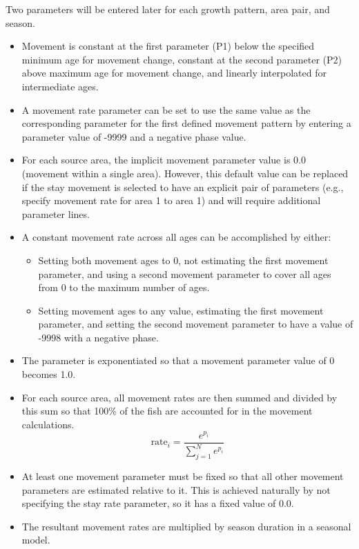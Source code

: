 Two parameters will be entered later for each growth pattern, area pair, and season.
\begin{itemize}
	\item Movement is constant at the first parameter (P1) below the specified minimum age for movement change, constant at the second parameter (P2) above maximum age for movement change, and linearly interpolated for intermediate ages.
	\item A movement rate parameter can be set to use the same value as the corresponding parameter for the first defined movement pattern by entering a parameter value of -9999 and a negative phase value.
	\item For each source area, the implicit movement parameter value is 0.0 (movement within a single area). However, this default value can be replaced if the stay movement is selected to have an explicit pair of parameters (e.g., specify movement rate for area 1 to area 1) and will require additional parameter lines.
	\item A constant movement rate across all ages can be accomplished by either:
	\begin{itemize}
		\item Setting both movement ages to 0, not estimating the first movement parameter, and using a second movement parameter to cover all ages from 0 to the maximum number of ages.
		\item Setting movement ages to any value, estimating the first movement parameter, and setting the second movement parameter to have a value of -9998 with a negative phase.
	\end{itemize} 
	\item The parameter is exponentiated so that a movement parameter value of 0 becomes 1.0.
	\item For each source area, all movement rates are then summed and divided by this sum so that 100\% of the fish are accounted for in the movement calculations.
	\begin{equation}
	\text{rate}_i = \frac{e^{p_i}}{\sum_{j=1}^{N}e^{p_i}}
	\end{equation}
	\item At least one movement parameter must be fixed so that all other movement parameters are estimated relative to it. This is achieved naturally by not specifying the stay rate parameter, so it has a fixed value of 0.0.
	\item The resultant movement rates are multiplied by season duration in a seasonal model.	
\end{itemize}


